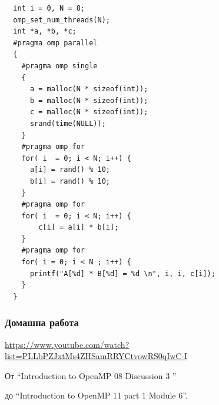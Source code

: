 \documentclass{beamer}
\begin{document}
\begin{frame}
\scriptsize
\lstset{language=C++}
\begin{lstlisting}
  int i = 0, N = 8;
  omp_set_num_threads(N);
  int *a, *b, *c;
  #pragma omp parallel
  {
    #pragma omp single
    {
      a = malloc(N * sizeof(int));
      b = malloc(N * sizeof(int));
      c = malloc(N * sizeof(int));
      srand(time(NULL));
    }
    #pragma omp for
    for( i  = 0; i < N; i++) {
      a[i] = rand() % 10;  
      b[i] = rand() % 10;
    }
    #pragma omp for
    for( i  = 0; i < N; i++) {
        c[i] = a[i] * b[i];
    }
    #pragma omp for
    for( i = 0; i < N ; i++) {
      printf("A[%d] * B[%d] = %d \n", i, i, c[i]);
    }
  }
\end{lstlisting}
\end{frame}


\begin{frame}
  \frametitle{Домашна работа}
\url{https://www.youtube.com/watch?list=PLLbPZJxtMs4ZHSamRRYCtvowRS0qIwC-I}  

От ``Introduction to OpenMP 08 Discussion 3 ''
 
до ``Introduction to OpenMP 11 part 1 Module 6''.

\end{frame}
\end{document}
